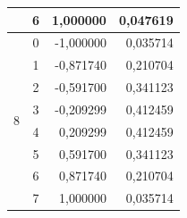 \begin{table}[htpb]
\begin{tabular}{|c|c|r|r|}
& 6 &  1,000000 & 0,047619 \\ \hline
\multirow{8}{*}{8} 
& 0 & -1,000000 & 0,035714 \\ \cline{2-4}
& 1 & -0,871740 & 0,210704 \\ \cline{2-4}
& 2 & -0,591700 & 0,341123 \\ \cline{2-4}
& 3 & -0,209299 & 0,412459 \\ \cline{2-4}
& 4 &  0,209299 & 0,412459 \\ \cline{2-4}
& 5 &  0,591700 & 0,341123 \\ \cline{2-4}
& 6 &  0,871740 & 0,210704 \\ \cline{2-4}
& 7 &  1,000000 & 0,035714 \\ \hline
\end{tabular}
\end{table}